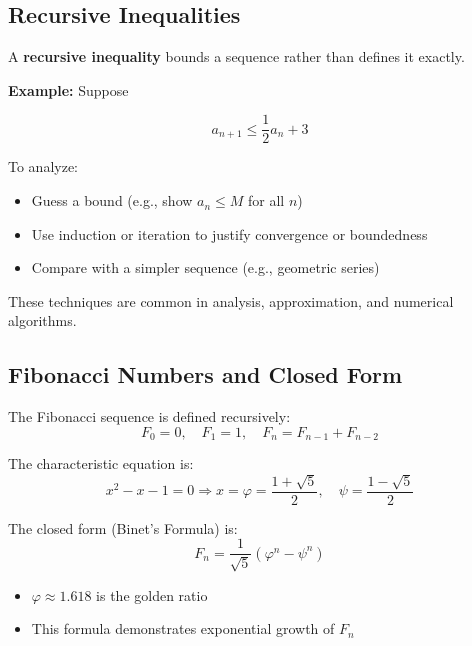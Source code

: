\subsection{Recursive Inequalities}

A \textbf{recursive inequality} bounds a sequence rather than defines it exactly.

\textbf{Example:} Suppose

\[
a_{n+1} \le \frac{1}{2} a_n + 3
\]

To analyze:
\begin{itemize}[label=\(-\)]
    \item Guess a bound (e.g., show \( a_n \le M \) for all \( n \))
    \item Use induction or iteration to justify convergence or boundedness
    \item Compare with a simpler sequence (e.g., geometric series)
\end{itemize}

These techniques are common in analysis, approximation, and numerical algorithms.

\subsection{Fibonacci Numbers and Closed Form}

The Fibonacci sequence is defined recursively:
\[
F_0 = 0, \quad F_1 = 1, \quad F_n = F_{n-1} + F_{n-2}
\]

The characteristic equation is:
\[
x^2 - x - 1 = 0 \Rightarrow x = \varphi = \frac{1 + \sqrt{5}}{2}, \quad \psi = \frac{1 - \sqrt{5}}{2}
\]

The closed form (Binet’s Formula) is:
\[
F_n = \frac{1}{\sqrt{5}} \left( \varphi^n - \psi^n \right)
\]

\begin{itemize}[label=\(-\)]
    \item \( \varphi \approx 1.618 \) is the golden ratio
    \item This formula demonstrates exponential growth of \( F_n \)
\end{itemize}

\newpage
